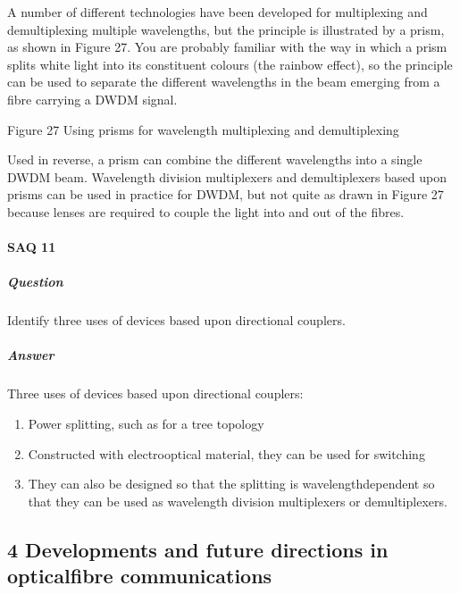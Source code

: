 \documentclass[letterpaper,10pt,english]{sphinxmanual}
\let\sphinxpxdimen\pdfpxdimen\else\newdimen\sphinxpxdimen
\begin{document}
A number of different technologies have been developed for multiplexing and demultiplexing multiple wavelengths, but the principle is illustrated by a prism, as shown in Figure 27. You are probably familiar with the way in which a prism splits white light into its constituent colours (the rainbow effect), so the principle can be used to separate the different wavelengths in the beam emerging from a fibre carrying a DWDM signal.

\sphinxincludegraphics[width=511\sphinxpxdimen,height=154\sphinxpxdimen]{{t305_026i}.jpg}

Figure 27 Using prisms for wavelength multiplexing and demultiplexing

Used in reverse, a prism can combine the different wavelengths into a single DWDM beam. Wavelength division multiplexers and demultiplexers based upon prisms can be used in practice for DWDM, but not quite as drawn in Figure 27 because lenses are required to couple the light into and out of the fibres.


\paragraph{SAQ 11}
\label{\detokenize{content/session_00/Part_00_03:SAQ-11}}

\subparagraph{Question}
\label{\detokenize{content/session_00/Part_00_03:id7}}
Identify three uses of devices based upon directional couplers.


\subparagraph{Answer}
\label{\detokenize{content/session_00/Part_00_03:id8}}
Three uses of devices based upon directional couplers:
\begin{enumerate}
%
\item {} 
Power splitting, such as for a tree topology

\item {} 
Constructed with electro\sphinxhyphen{}optical material, they can be used for switching

\item {} 
They can also be designed so that the splitting is wavelength\sphinxhyphen{}dependent so that they can be used as wavelength division multiplexers or demultiplexers.

\end{enumerate}




\subsection{4 Developments and future directions in optical\sphinxhyphen{}fibre communications}
\label{\detokenize{content/session_00/Part_00_04:4-Developments-and-future-directions-in-optical-fibre-communications}}\label{\detokenize{content/session_00/Part_00_04::doc}}
\end{document}
